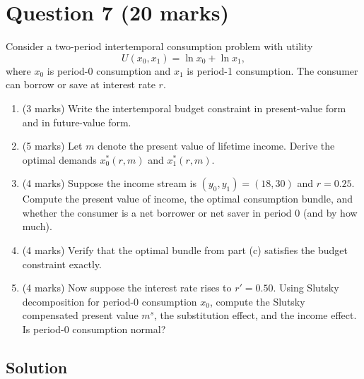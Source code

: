 \documentclass[12pt]{article}
\begin{document}
\medskip

\newpage
\section*{Question 7 (20 marks)}

Consider a two-period intertemporal consumption problem with utility
\[
U(x_0,x_1)=\ln x_0+\ln x_1,
\]
where $x_0$ is period-0 consumption and $x_1$ is period-1 consumption. The consumer can borrow or save at interest rate $r$.

\begin{enumerate}[label=(\alph*)]
\item (3 marks) Write the intertemporal budget constraint in present-value form and in future-value form.
\item (5 marks) Let $m$ denote the present value of lifetime income. Derive the optimal demands $x_0^*(r,m)$ and $x_1^*(r,m)$.
\item (4 marks) Suppose the income stream is $(y_0,y_1)=(18,30)$ and $r=0.25$. Compute the present value of income, the optimal consumption bundle, and whether the consumer is a net borrower or net saver in period 0 (and by how much).
\item (4 marks) Verify that the optimal bundle from part (c) satisfies the budget constraint exactly.
\item (4 marks) Now suppose the interest rate rises to $r'=0.50$. Using Slutsky decomposition for period-0 consumption $x_0$, compute the Slutsky compensated present value $m^s$, the substitution effect, and the income effect. Is period-0 consumption normal?
\end{enumerate}

\subsection*{Solution}
\end{document}
